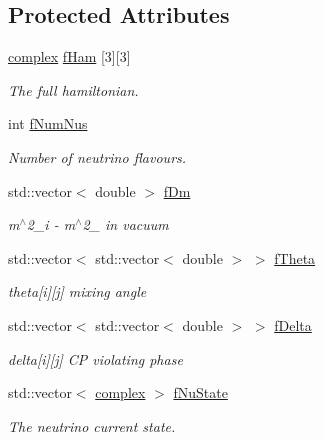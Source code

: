 \subsection*{Protected Attributes}
\begin{DoxyCompactItemize}
\item 
\hyperlink{classOscProb_1_1PMNS__Base_ae86ec4718808ce9d02e5f5b4226714ab}{complex} \hyperlink{classOscProb_1_1PMNS__Fast_aab37f2a7f59ab7026a8a21a561115dd0}{f\+Ham} \mbox{[}3\mbox{]}\mbox{[}3\mbox{]}
\begin{DoxyCompactList}\small\item\em The full hamiltonian. \end{DoxyCompactList}\item 
int \hyperlink{classOscProb_1_1PMNS__Base_a24bb74bed63569dfe88b18fa6a08060e}{f\+Num\+Nus}
\begin{DoxyCompactList}\small\item\em Number of neutrino flavours. \end{DoxyCompactList}\item 
std\+::vector$<$ double $>$ \hyperlink{classOscProb_1_1PMNS__Base_a406a31c3b5d620e5a0cace5b411f9f70}{f\+Dm}
\begin{DoxyCompactList}\small\item\em m$^\wedge$2\+\_\+i -\/ m$^\wedge$2\+\_ in vacuum \end{DoxyCompactList}\item 
std\+::vector$<$ std\+::vector$<$ double $>$ $>$ \hyperlink{classOscProb_1_1PMNS__Base_a1976887cd658dd86b2336c181f1470b4}{f\+Theta}
\begin{DoxyCompactList}\small\item\em theta\mbox{[}i\mbox{]}\mbox{[}j\mbox{]} mixing angle \end{DoxyCompactList}\item 
std\+::vector$<$ std\+::vector$<$ double $>$ $>$ \hyperlink{classOscProb_1_1PMNS__Base_ab2a5fa40e689b221c8a7d2c17213810d}{f\+Delta}
\begin{DoxyCompactList}\small\item\em delta\mbox{[}i\mbox{]}\mbox{[}j\mbox{]} CP violating phase \end{DoxyCompactList}\item 
std\+::vector$<$ \hyperlink{classOscProb_1_1PMNS__Base_ae86ec4718808ce9d02e5f5b4226714ab}{complex} $>$ \hyperlink{classOscProb_1_1PMNS__Base_ad38a7107c3ab393591fd5ba21658300b}{f\+Nu\+State}
\begin{DoxyCompactList}\small\item\em The neutrino current state. \end{DoxyCompactList}\item 

\end{DoxyCompactItemize}
